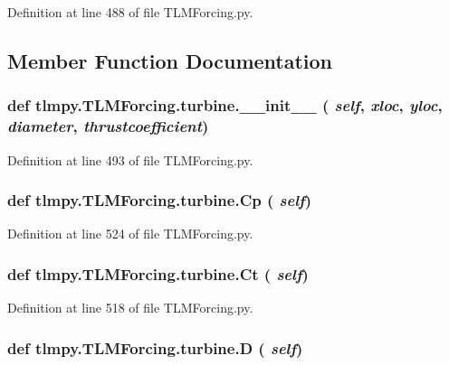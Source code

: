 Definition at line 488 of file TLMForcing.py.

\subsection{Member Function Documentation}
\hypertarget{classtlmpy_1_1TLMForcing_1_1turbine_ab1bed36d8c7c66b6d49cab1c0f82d884}{
\subsubsection[{\_\-\_\-init\_\-\_\-}]{\setlength{\rightskip}{0pt plus 5cm}def tlmpy.TLMForcing.turbine.\_\-\_\-init\_\-\_\- ( {\em self}, \/   {\em xloc}, \/   {\em yloc}, \/   {\em diameter}, \/   {\em thrustcoefficient})}}
\label{classtlmpy_1_1TLMForcing_1_1turbine_ab1bed36d8c7c66b6d49cab1c0f82d884}


Definition at line 493 of file TLMForcing.py.\hypertarget{classtlmpy_1_1TLMForcing_1_1turbine_a980be5b6335de8f672705551634862b2}{
\subsubsection[{Cp}]{\setlength{\rightskip}{0pt plus 5cm}def tlmpy.TLMForcing.turbine.Cp ( {\em self})}}
\label{classtlmpy_1_1TLMForcing_1_1turbine_a980be5b6335de8f672705551634862b2}


Definition at line 524 of file TLMForcing.py.\hypertarget{classtlmpy_1_1TLMForcing_1_1turbine_a0f86ae7c7cb308f5c3be4bf31c9918f4}{
\subsubsection[{Ct}]{\setlength{\rightskip}{0pt plus 5cm}def tlmpy.TLMForcing.turbine.Ct ( {\em self})}}
\label{classtlmpy_1_1TLMForcing_1_1turbine_a0f86ae7c7cb308f5c3be4bf31c9918f4}


Definition at line 518 of file TLMForcing.py.\hypertarget{classtlmpy_1_1TLMForcing_1_1turbine_aca411fca2f237d6acfd01e4554321c4d}{
\subsubsection[{D}]{\setlength{\rightskip}{0pt plus 5cm}def tlmpy.TLMForcing.turbine.D ( {\em self})}}
\label{classtlmpy_1_1TLMForcing_1_1turbine_aca411fca2f237d6acfd01e4554321c4d}


